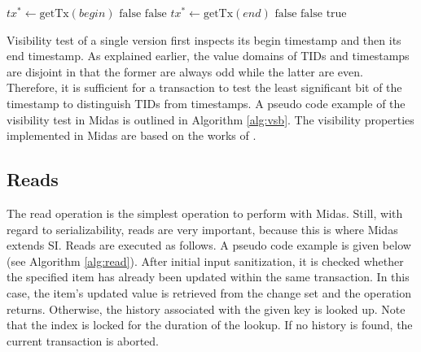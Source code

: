 \begin{algorithm}
\begin{algorithmic}[1]
\State $\textit{tx}^{*} \gets \text{getTx}(\textit{begin})$
\State \Return $\text{false}$
\EndIf
\Else
{}
\State \Return $\text{false}$
\EndIf
\EndIf
\State
{}
\State $\textit{tx}^{*} \gets \text{getTx}(\textit{end})$
\State \Return $\text{false}$
\EndIf
\Else
{}
\State \Return $\text{false}$
\EndIf
\EndIf
\State \Return $\text{true}$
\EndProcedure
\end{algorithmic}
\caption{}
\label{alg:vsb}
\end{algorithm}

Visibility test of a single version first inspects its begin timestamp and then its end timestamp. As explained earlier, the value domains of TIDs and timestamps are disjoint in that the former are always odd while the latter are even. Therefore, it is sufficient for a transaction to test the least significant bit of the timestamp to distinguish TIDs from timestamps. A pseudo code example of the visibility test in Midas is outlined in Algorithm \ref{alg:vsb}. The visibility properties implemented in Midas are based on
the works of \cite{berenson1995critique, larson2011high}.

\subsection{Reads}

The read operation is the simplest operation to perform with Midas. Still, with regard to serializability, reads are very important, because this is where Midas extends SI. Reads are executed as follows. A pseudo code example is given below (see Algorithm \ref{alg:read}). After initial input sanitization, it is checked whether the specified item has already been updated within the same transaction. In this case, the item's updated value is retrieved from the change set and the operation returns. Otherwise, the history associated with the given key is looked up. Note that the index is locked for the duration of the lookup. If no history is found, the current transaction is aborted.

